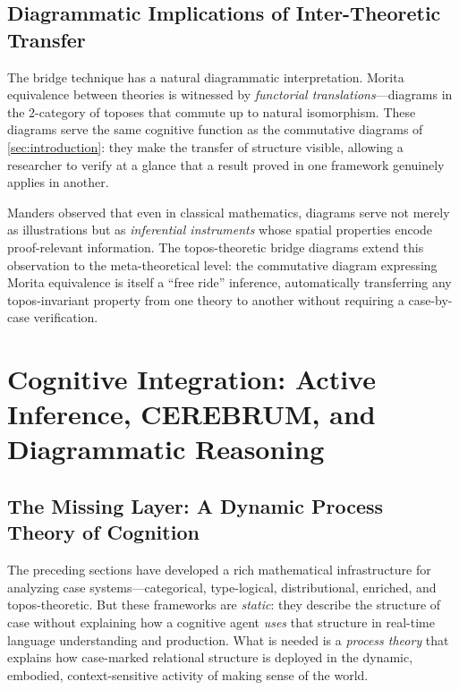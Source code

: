 \documentclass[
]{article}
\numberwithin{equation}{section}
\begin{document}
\subsection{Diagrammatic Implications of Inter-Theoretic
Transfer}\label{diagrammatic-implications-of-inter-theoretic-transfer}

The bridge technique has a natural diagrammatic interpretation. Morita
equivalence between theories is witnessed by \emph{functorial
translations}---diagrams in the 2-category of toposes that commute up to
natural isomorphism. These diagrams serve the same cognitive function as
the commutative diagrams of \autoref{sec:introduction}: they make the
transfer of structure visible, allowing a researcher to verify at a
glance that a result proved in one framework genuinely applies in
another.

Manders \citeyearpar{manders2008euclidean} observed that even in
classical mathematics, diagrams serve not merely as illustrations but as
\emph{inferential instruments} whose spatial properties encode
proof-relevant information. The topos-theoretic bridge diagrams extend
this observation to the meta-theoretical level: the commutative diagram
expressing Morita equivalence is itself a ``free ride'' inference,
automatically transferring any topos-invariant property from one theory
to another without requiring a case-by-case verification.

\newpage

\section{Cognitive Integration: Active Inference, CEREBRUM, and
Diagrammatic Reasoning}\label{sec:cognitive-integration}

\subsection{The Missing Layer: A Dynamic Process Theory of
Cognition}\label{the-missing-layer-a-dynamic-process-theory-of-cognition}

The preceding sections have developed a rich mathematical infrastructure
for analyzing case systems---categorical, type-logical, distributional,
enriched, and topos-theoretic. But these frameworks are \emph{static}:
they describe the structure of case without explaining how a cognitive
agent \emph{uses} that structure in real-time language understanding and
production. What is needed is a \emph{process theory} that explains how
case-marked relational structure is deployed in the dynamic, embodied,
context-sensitive activity of making sense of the world.
\end{document}
